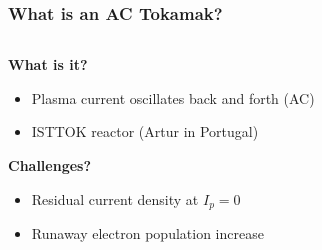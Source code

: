 \documentclass{beamer}
\begin{document}
\begin{frame}
\frametitle{What is an AC Tokamak?}

\begin{columns}[T]

    \begin{column}{.5\textwidth}
        \textbf{What is it?}
        \begin{itemize}
            \item Plasma current oscillates back and forth (AC)
            \item ISTTOK reactor (Artur in Portugal)
        \end{itemize}

        \textbf{Challenges?}
        \begin{itemize}
            \item Residual current density at $I_p = 0$
            \item Runaway electron population increase
        \end{itemize}
    \end{column}


\end{columns}
\end{frame}
\end{document}
